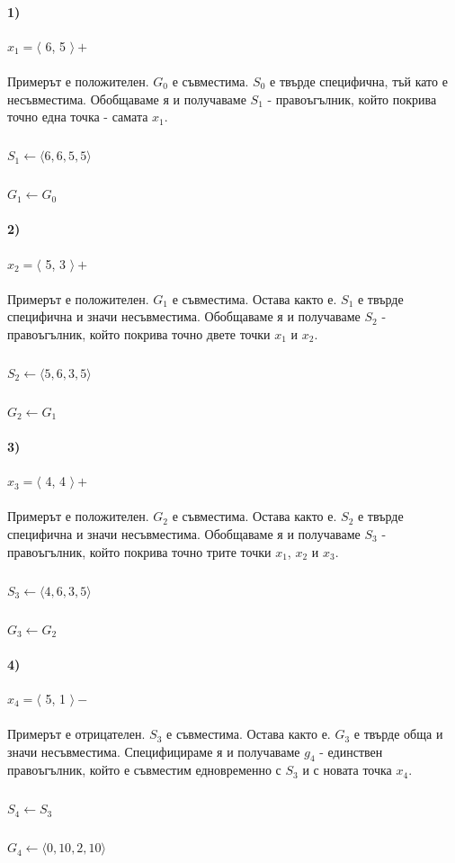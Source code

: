 \documentclass[12pt]{article}
\begin{document}
	\paragraph{1)} $x_{1} = \langle $ 6, 5 $\rangle  +$
	\paragraph{}
	Примерът е положителен. $G_{0}$ е съвместима. $S_{0}$ е твърде специфична, тъй като е несъвместима. Обобщаваме я и получаваме $S_{1}$ - правоъгълник, който покрива точно една точка - самата $x_{1}$.
		\subparagraph{}
		$S_{1} \leftarrow \langle 6, 6, 5, 5 \rangle$
		\subparagraph{}
		$G_{1} \leftarrow G_{0}$
		
	\paragraph{2)} $x_{2} = \langle $ 5, 3 $\rangle  +$
	\paragraph{}
	Примерът е положителен. $G_{1}$ е съвместима. Остава както е. $S_{1}$ е твърде специфична и значи несъвместима. Обобщаваме я и получаваме $S_{2}$ - правоъгълник, който покрива точно двете точки $x_{1}$ и $x_{2}$.
		\subparagraph{}
		$S_{2} \leftarrow \langle 5, 6, 3, 5 \rangle$
		\subparagraph{}
		$G_{2} \leftarrow G_{1}$
		
	\paragraph{3)} $x_{3} = \langle $ 4, 4 $\rangle  +$
	\paragraph{}
	Примерът е положителен. $G_{2}$ е съвместима. Остава както е. $S_{2}$ е твърде специфична и значи несъвместима. Обобщаваме я и получаваме $S_{3}$ - правоъгълник, който покрива точно трите точки $x_{1}$, $x_{2}$ и $x_{3}$.
		\subparagraph{}
		$S_{3} \leftarrow \langle 4, 6, 3, 5 \rangle$
		\subparagraph{}
		$G_{3} \leftarrow G_{2}$
	
	\paragraph{4)} $x_{4} = \langle $ 5, 1 $\rangle  -$
	\paragraph{}
	Примерът е отрицателен. $S_{3}$ е съвместима. Остава както е. $G_{3}$ е твърде обща и значи несъвместима. Специфицираме я и получаваме $g_{4}$ - единствен правоъгълник, който е съвместим едновременно с $S_{3}$ и с новата точка $x_{4}$.
		\subparagraph{}
		$S_{4} \leftarrow S_{3}$
		\subparagraph{}
		$G_{4} \leftarrow \langle 0, 10, 2, 10 \rangle$
	
\end{document}
